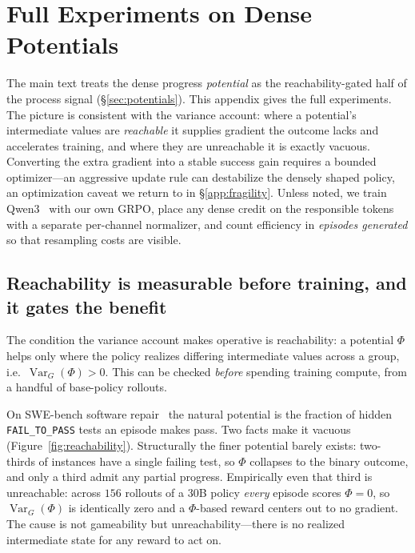 \section{Full Experiments on Dense Potentials}
\label{app:potentials}

The main text treats the dense progress \emph{potential} as the reachability-gated half of the process signal (\S\ref{sec:potentials}). This appendix gives the full experiments. The picture is consistent with the variance account: where a potential's intermediate values are \emph{reachable} it supplies gradient the outcome lacks and accelerates training, and where they are unreachable it is exactly vacuous. Converting the extra gradient into a stable success gain requires a bounded optimizer---an aggressive update rule can destabilize the densely shaped policy, an optimization caveat we return to in \S\ref{app:fragility}. Unless noted, we train Qwen3~\citep{qwen3} with our own GRPO, place any dense credit on the responsible tokens with a separate per-channel normalizer, and count efficiency in \emph{episodes generated} so that resampling costs are visible.

\subsection{Reachability is measurable before training, and it gates the benefit}
\label{app:reachability}

The condition the variance account makes operative is reachability: a potential $\Phi$ helps only where the policy realizes differing intermediate values across a group, i.e.\ $\operatorname{Var}_G(\Phi)>0$. This can be checked \emph{before} spending training compute, from a handful of base-policy rollouts.

On SWE-bench software repair~\citep{swebench} the natural potential is the fraction of hidden \texttt{FAIL\_TO\_PASS} tests an episode makes pass. Two facts make it vacuous (Figure~\ref{fig:reachability}). Structurally the finer potential barely exists: two-thirds of instances have a single failing test, so $\Phi$ collapses to the binary outcome, and only a third admit any partial progress. Empirically even that third is unreachable: across $156$ rollouts of a $30$B policy \emph{every} episode scores $\Phi=0$, so $\operatorname{Var}_G(\Phi)$ is identically zero and a $\Phi$-based reward centers out to no gradient. The cause is not gameability but unreachability---there is no realized intermediate state for any reward to act on.


